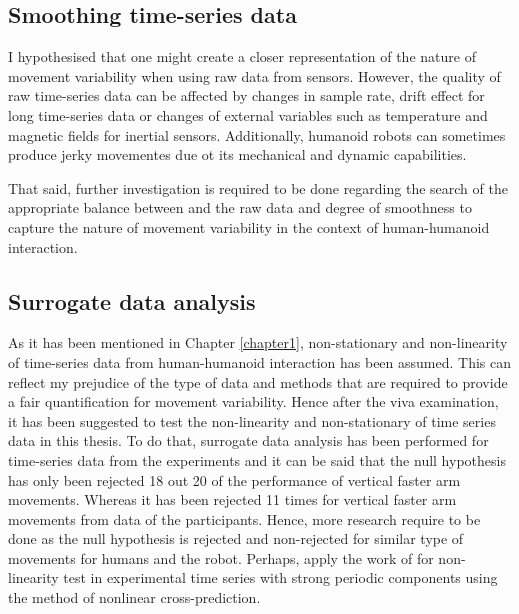\subsection*{Smoothing time-series data}
I hypothesised that one might create a closer representation of the 
nature of movement variability when using raw data from sensors.
However, the quality of raw time-series data can be affected 
by changes in sample rate, drift effect for long time-series data or 
changes of external variables such as 
temperature and magnetic fields for inertial sensors. 
Additionally, humanoid robots can sometimes produce
jerky movementes due ot its mechanical and dynamic capabilities.

That said, further investigation is required to be done
regarding the search of the appropriate balance between 
and the raw data and degree of smoothness 
to capture the nature of movement variability
in the context of human-humanoid interaction. 


\subsection*{Surrogate data analysis}
As it has been mentioned in Chapter \ref{chapter1},
non-stationary and non-linearity of time-series data 
from human-humanoid interaction has been assumed.
This can reflect my prejudice of the type of data 
and methods that are required to provide a fair 
quantification for movement variability.
Hence after the viva examination, it has been suggested to 
test the non-linearity and non-stationary of time series data 
in this thesis.
To do that, surrogate data analysis has been performed 
for time-series data from the experiments and 
it can be said that the null hypothesis has only been rejected 
18 out 20 of the performance of vertical faster arm movements.
Whereas it has been rejected 11 times for vertical faster arm movements
from data of the participants.
Hence, more research require to be done as 
the null hypothesis is rejected and non-rejected for similar 
type of movements for humans and the robot.
Perhaps, apply the work of \cite{stam1998} 
for non-linearity test in experimental time series with 
strong periodic components using the method of 
nonlinear cross-prediction.



